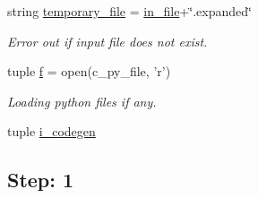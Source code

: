 \begin{DoxyCompactItemize}
string \hyperlink{namespaceveripy_afad07aa9410aaa39c3a55e59c48c67d2}{temporary\-\_\-file} = \hyperlink{namespaceveripy_af4fff95eb237e9d797e670d3c1a94b61}{in\-\_\-file}+\char`\"{}.expanded\char`\"{}
\begin{DoxyCompactList}\small\item\em Error out if input file does not exist. \end{DoxyCompactList}\item 
tuple \hyperlink{namespaceveripy_ae63271cecab2d5e49fee340d8d7f79e5}{f} = open(c\-\_\-py\-\_\-file, 'r')
\begin{DoxyCompactList}\small\item\em Loading python files if any. \end{DoxyCompactList}\item 
tuple \hyperlink{namespaceveripy_a1f71748b181889d37c2cfcf786822fef}{i\-\_\-codegen}
\begin{DoxyCompactList}\small\item\em \subsection*{Step\-: 1 }


\end{DoxyCompactList}
\end{DoxyCompactItemize}

